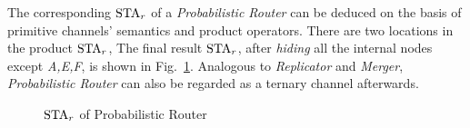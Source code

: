 \begin{example}
The corresponding $\mbox{STA}_r$ of a \emph{Probabilistic Router} can be deduced on the basis of primitive channels' semantics and product operators.
There are two locations in the product $\mbox{STA}_r$, 
The final result $\mbox{STA}_r$, after \emph{hiding} all the internal nodes except \emph{A,E,F}, is shown in Fig.~\ref{fig:probabilistic_router}. Analogous to \emph{Replicator} and \emph{Merger}, \emph{Probabilistic Router} can also be regarded as a ternary channel afterwards.
\begin{figure}[H]
\centering

\caption{$\mbox{STA}_r$ of Probabilistic Router}
\label{fig:probabilistic_router}
\end{figure}
\end{example}

